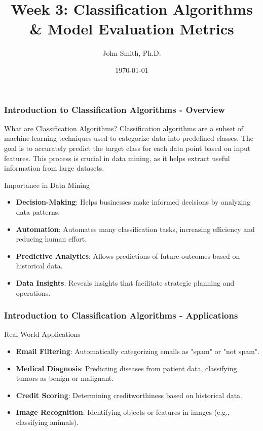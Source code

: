 \documentclass[aspectratio=169]{beamer}
\title[Classification Algorithms]{Week 3: Classification Algorithms \& Model Evaluation Metrics}
\author[J. Smith]{John Smith, Ph.D.}
\institute[University Name]{
  Department of Computer Science\\
  University Name\\
  \vspace{0.3cm}
  Email: email@university.edu\\
  Website: www.university.edu
}
\date{\today}
\begin{document}
\frame{\titlepage}

\begin{frame}[fragile]
    \frametitle{Introduction to Classification Algorithms - Overview}
    \begin{block}{What are Classification Algorithms?}
        Classification algorithms are a subset of machine learning techniques used to categorize data into predefined classes. 
        The goal is to accurately predict the target class for each data point based on input features. This process is crucial in data mining, as it helps extract useful information from large datasets.
    \end{block}
    
    \begin{block}{Importance in Data Mining}
        \begin{itemize}
            \item \textbf{Decision-Making}: Helps businesses make informed decisions by analyzing data patterns.
            \item \textbf{Automation}: Automates many classification tasks, increasing efficiency and reducing human effort.
            \item \textbf{Predictive Analytics}: Allows predictions of future outcomes based on historical data.
            \item \textbf{Data Insights}: Reveals insights that facilitate strategic planning and operations.
        \end{itemize}
    \end{block}
\end{frame}

\begin{frame}[fragile]
    \frametitle{Introduction to Classification Algorithms - Applications}
    \begin{block}{Real-World Applications}
        \begin{itemize}
            \item \textbf{Email Filtering}: Automatically categorizing emails as "spam" or "not spam".
            \item \textbf{Medical Diagnosis}: Predicting diseases from patient data, classifying tumors as benign or malignant.
            \item \textbf{Credit Scoring}: Determining creditworthiness based on historical data.
            \item \textbf{Image Recognition}: Identifying objects or features in images (e.g., classifying animals).
        \end{itemize}
    \end{block}
\end{frame}
\end{document}

